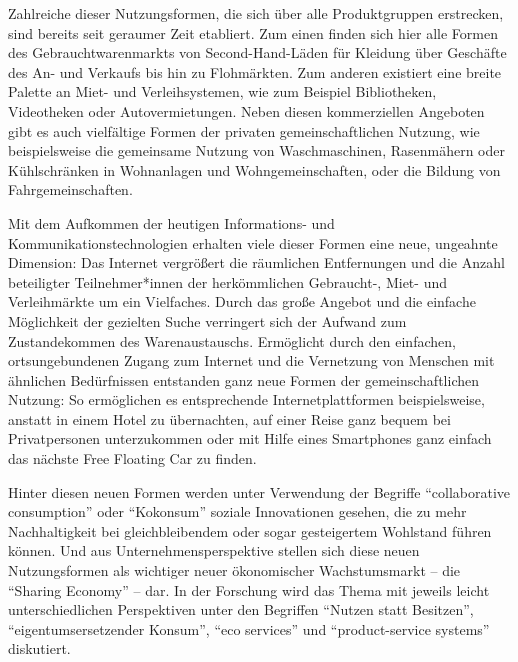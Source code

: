 \documentclass[11pt, titlepage=true]{scrartcl} %
\begin{document}
Zahlreiche dieser Nutzungsformen, die sich über alle Produktgruppen erstrecken,
sind bereits seit geraumer Zeit etabliert. Zum einen finden sich hier alle Formen des Gebrauchtwarenmarkts von Second-Hand-Läden für Kleidung über Geschäfte des An- und Verkaufs bis hin zu Flohmärkten. Zum anderen existiert eine breite Palette an Miet- und Verleihsystemen, wie zum
Beispiel Bibliotheken, Videotheken oder Autovermietungen. Neben diesen kommerziellen Angeboten gibt es auch vielfältige Formen der privaten gemeinschaftlichen Nutzung, wie
beispielsweise die gemeinsame Nutzung von Waschmaschinen, Rasenmähern oder Kühlschränken in
Wohnanlagen und Wohngemeinschaften, oder die Bildung von Fahrgemeinschaften.

Mit dem Aufkommen der heutigen Informations- und Kommunikationstechnologien
erhalten viele dieser Formen eine neue, ungeahnte Dimension: Das Internet
vergrößert die räumlichen Entfernungen und die Anzahl beteiligter
Teilnehmer*innen der herkömmlichen Gebraucht-, Miet- und Verleihmärkte um ein
Vielfaches. Durch das große Angebot und die einfache Möglichkeit der gezielten
Suche verringert sich der Aufwand zum Zustandekommen des Warenaustauschs.
Ermöglicht durch den einfachen, ortsungebundenen Zugang zum Internet und die
Vernetzung von Menschen mit ähnlichen Bedürfnissen entstanden ganz neue Formen
der gemeinschaftlichen Nutzung: So ermöglichen es entsprechende
Internetplattformen beispielsweise, anstatt in einem Hotel zu übernachten, auf
einer Reise ganz bequem bei Privatpersonen unterzukommen oder mit Hilfe eines
Smartphones ganz einfach das nächste Free Floating Car zu finden.

Hinter diesen neuen Formen werden unter Verwendung der Begriffe
\enquote{collaborative consumption} oder \enquote{Kokonsum} soziale Innovationen
gesehen, die zu mehr Nachhaltigkeit bei gleichbleibendem oder sogar gesteigertem
Wohlstand führen können. Und aus Unternehmensperspektive stellen sich diese
neuen Nutzungsformen als wichtiger neuer ökonomischer Wachstumsmarkt -- die
\enquote{Sharing Economy} -- dar. In der Forschung wird das Thema mit jeweils
leicht unterschiedlichen Perspektiven unter den Begriffen \enquote{Nutzen statt
Besitzen}, \enquote{eigentumsersetzender Konsum}, \enquote{eco services} und
\enquote{product-service systems} diskutiert. 
\end{document}
